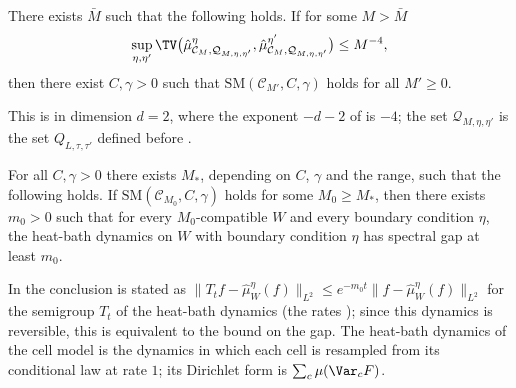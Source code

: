\begin{theorem}\label{t:MOS21}
There exists $\bar M$ such that the following holds. If for some $M > \bar M$
\begin{equation}\label{e:MOS22}
\sup_{\eta, \eta'} \TV\bigl( \hat\mu^\eta_{\mathcal C_M, \mathcal Q_{M, \eta, \eta'}}, \hat\mu^{\eta'}_{\mathcal C_M, \mathcal Q_{M, \eta, \eta'}} \bigr) \le M^{-4},
\end{equation}
then there exist $C, \gamma > 0$ such that $\mathrm{SM}(\mathcal C_{M'}, C, \gamma)$ holds for all $M' \ge 0$.
\end{theorem}

This is \cite[Theorem~2.1]{MOS94} in dimension $d = 2$, where the exponent $-d - 2$ of \cite[(2.2)]{MOS94} is $-4$; the set $\mathcal Q_{M, \eta, \eta'}$ is the set $Q_{L, \tau, \tau'}$ defined before \cite[Proposition~2.1]{MOS94}.

\begin{theorem}[{\cite[Theorem~4.1]{MO94}}]\label{t:MO41}
For all $C, \gamma > 0$ there exists $M_*$, depending on $C$, $\gamma$ and the range, such that the following holds. If $\mathrm{SM}(\mathcal C_{M_0}, C, \gamma)$ holds for some $M_0 \ge M_*$, then there exists $m_0 > 0$ such that for every $M_0$-compatible $W$ and every boundary condition $\eta$, the heat-bath dynamics on $W$ with boundary condition $\eta$ has spectral gap at least $m_0$.
\end{theorem}

In \cite{MO94} the conclusion is stated as $\|T_t f - \hat\mu^\eta_W(f)\|_{L^2} \le e^{-m_0 t} \|f - \hat\mu^\eta_W(f)\|_{L^2}$ for the semigroup $T_t$ of the heat-bath dynamics (the rates \cite[(4.1)]{MO94}); since this dynamics is reversible, this is equivalent to the bound on the gap. The heat-bath dynamics of the cell model is the dynamics in which each cell is resampled from its conditional law at rate $1$; its Dirichlet form is $\sum_c \mu(\Var_c F)$.

